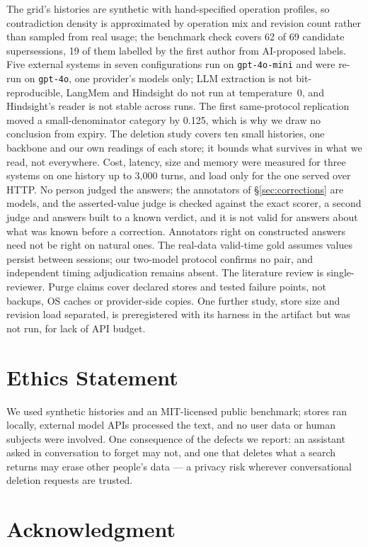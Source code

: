 \documentclass[conference]{IEEEtran}
\begin{document}
The grid's histories are synthetic with hand-specified operation profiles, so
contradiction density is approximated by operation mix and revision count rather
than sampled from real usage; the benchmark check covers 62 of 69 candidate
supersessions, 19 of them labelled by the first author from AI-proposed labels. Five external systems in seven configurations
run on \texttt{gpt-4o-mini} and were re-run on \texttt{gpt-4o}, one provider's
models only; LLM extraction is not bit-reproducible, LangMem and Hindsight do not
run at temperature~0, and Hindsight's reader is not stable across runs. The
first same-protocol replication moved a small-denominator category by 0.125,
which is why we draw no conclusion from expiry. The deletion study covers ten
small histories, one backbone and our own readings of each store; it bounds
what survives in what we read, not everywhere. Cost, latency, size and memory were measured
for three systems on one history up to 3{,}000 turns, and load only for the one
served over HTTP. No person
judged the answers; the annotators of \S\ref{sec:corrections} are models, and the asserted-value judge is checked against the exact
scorer, a second judge and answers built to a known verdict, and it is not valid
for answers about what was known before a correction. Annotators right on
constructed answers need not be right on natural ones. The real-data valid-time
gold assumes values persist between sessions; our two-model protocol
confirms no pair, and independent timing adjudication remains absent. The literature review is single-reviewer. Purge claims cover declared
stores and tested failure points, not backups, OS caches or provider-side
copies. One further study, store size and revision load separated, is
preregistered with its harness in the artifact but was not run, for lack of API
budget.

\section*{Ethics Statement}

We used synthetic histories and an MIT-licensed public benchmark; stores ran
locally, external model APIs processed the text, and no user data or human
subjects were involved. One consequence of the defects we report: an assistant
asked in conversation to forget may not, and one that deletes what a search
returns may erase other people's data --- a privacy risk wherever
conversational deletion requests are trusted.

\section*{Acknowledgment}
\end{document}
